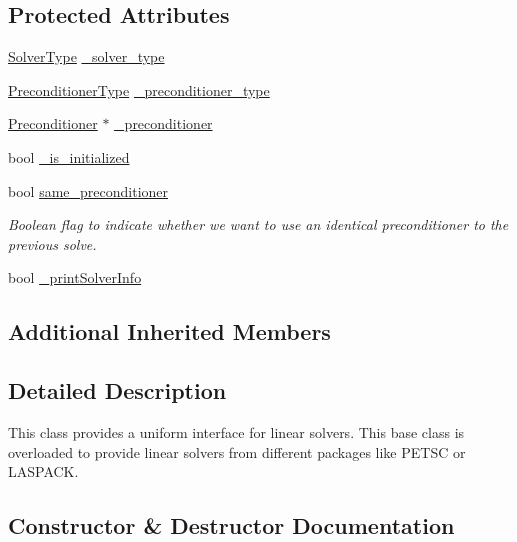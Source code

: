\subsection*{Protected Attributes}
\begin{DoxyCompactItemize}
\item 
\mbox{\hyperlink{_solvertype_enum_8hpp_a8b06041d7c1fb05f379714f4312306ec}{Solver\+Type}} \mbox{\hyperlink{classfemus_1_1_linear_equation_solver_abdde428bf785abc19eaae56ff524924e}{\+\_\+solver\+\_\+type}}
\item 
\mbox{\hyperlink{_precondtype_enum_8hpp_a8b341faac6531c4543c9dc6e5e4592cf}{Preconditioner\+Type}} \mbox{\hyperlink{classfemus_1_1_linear_equation_solver_aeb95e2f8a6a1c23b54278252f4f418ad}{\+\_\+preconditioner\+\_\+type}}
\item 
\mbox{\hyperlink{classfemus_1_1_preconditioner}{Preconditioner}} $\ast$ \mbox{\hyperlink{classfemus_1_1_linear_equation_solver_ae7d568d4a992a82d1b06903cb7e384fb}{\+\_\+preconditioner}}
\item 
bool \mbox{\hyperlink{classfemus_1_1_linear_equation_solver_a17783185d47a441d545cf1427d2624ee}{\+\_\+is\+\_\+initialized}}
\item 
bool \mbox{\hyperlink{classfemus_1_1_linear_equation_solver_a0a3207fb3cca0f45b8909812f64f6efa}{same\+\_\+preconditioner}}
\begin{DoxyCompactList}\small\item\em Boolean flag to indicate whether we want to use an identical preconditioner to the previous solve. \end{DoxyCompactList}\item 
bool \mbox{\hyperlink{classfemus_1_1_linear_equation_solver_a7058888fb57ea520cce21647a69db329}{\+\_\+print\+Solver\+Info}}
\end{DoxyCompactItemize}
\subsection*{Additional Inherited Members}


\subsection{Detailed Description}
This class provides a uniform interface for linear solvers. This base class is overloaded to provide linear solvers from different packages like P\+E\+T\+SC or L\+A\+S\+P\+A\+CK. 

\subsection{Constructor \& Destructor Documentation}
\mbox{\label{classfemus_1_1_linear_equation_solver_afa8a2758d8652ab34789d9e9d06251fa}} 
